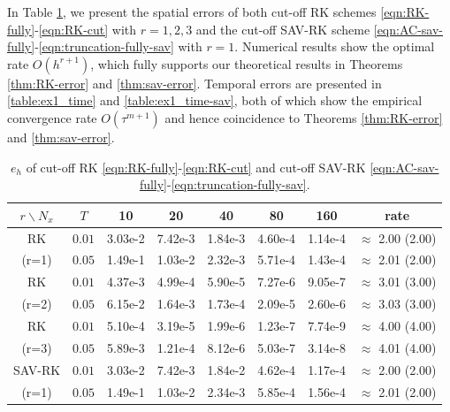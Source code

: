 \documentclass[10pt,final,leqno,onefignum,onetabnum]{siamltex}%
\begin{document}
In Table \ref{table:ex1_space}, we present the spatial errors of both
cut-off RK schemes \eqref{eqn:RK-fully}-\eqref{eqn:RK-cut} with $r=1,2,3$ and the cut-off SAV-RK scheme
\eqref{eqn:AC-sav-fully}-\eqref{eqn:truncation-fully-sav}  with $r=1$.
Numerical results show the optimal rate $O(h^{r+1})$, which fully supports our theoretical results in
Theorems \ref{thm:RK-error} and \ref{thm:sav-error}.
Temporal errors are presented in \ref{table:ex1_time} and \ref{table:ex1_time-sav},
both of which show the empirical convergence rate $O(\tau^{m+1})$
and hence coincidence to Theorems \ref{thm:RK-error} and \ref{thm:sav-error}.



\begin{table}[h]
\centering
\caption{$e_h$ of cut-off RK  \eqref{eqn:RK-fully}-\eqref{eqn:RK-cut}  and cut-off SAV-RK
\eqref{eqn:AC-sav-fully}-\eqref{eqn:truncation-fully-sav}. }
\begin{tabular}{|c|c|ccccc|c|}
\hline
$r\backslash N_x$  & $T$   &10 &20 &40 &80 &160&   rate \\
\hline
RK   &   $0.01$& 3.03e-2& 7.42e-3& 1.84e-3& 4.60e-4& 1.14e-4& $\approx$ 2.00 (2.00)    \\
 (r=1)   &   $0.05$& 1.49e-1& 1.03e-2& 2.32e-3& 5.71e-4& 1.43e-4& $\approx$ 2.01 (2.00)    \\
\hline
RK  &   $0.01$& 4.37e-3& 4.99e-4& 5.90e-5& 7.27e-6& 9.05e-7& $\approx$ 3.01 (3.00)    \\
(r=2)    &   $0.05$& 6.15e-2& 1.64e-3& 1.73e-4& 2.09e-5& 2.60e-6& $\approx$ 3.03 (3.00)    \\
\hline
RK   &   $0.01$& 5.10e-4& 3.19e-5& 1.99e-6& 1.23e-7& 7.74e-9&$\approx$ 4.00 (4.00)   \\
 (r=3)   &   $0.05$& 5.89e-3& 1.21e-4& 8.12e-6& 5.03e-7& 3.14e-8&$\approx$ 4.01 (4.00)    \\
\hline
SAV-RK &$0.01$& 3.03e-2& 7.42e-3& 1.84e-2& 4.62e-4& 1.17e-4& $\approx$ 2.00 (2.00)\\
(r=1)  &$0.05$& 1.49e-1& 1.03e-2& 2.34e-3& 5.85e-4& 1.56e-4& $\approx$ 2.01 (2.00)\\
\hline
\end{tabular}
\label{table:ex1_space}
\end{table}
\end{document}
